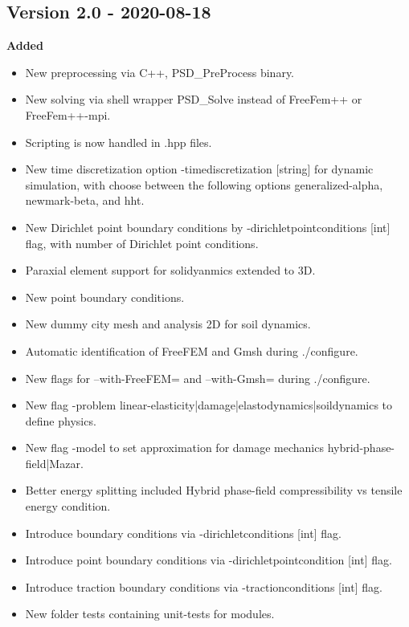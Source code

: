 \subsection{Version 2.0 - 2020-08-18}
\textbf{Added}
\begin{itemize}
    \item New preprocessing via C++, {\ttfamily PSD\_PreProcess} binary.
    \item New solving via shell wrapper {\ttfamily PSD\_Solve} instead of {\ttfamily FreeFem++} or {\ttfamily FreeFem++-mpi}.    
    \item Scripting is now handled in {\ttfamily .hpp} files.
    \item New time discretization option {\ttfamily -timediscretization [string]} for dynamic simulation, with {\ttfamily [string]} choose between the following options {\ttfamily generalized-alpha}, {\ttfamily newmark-beta}, and {\ttfamily hht}.
    \item New Dirichlet point boundary conditions  by {\ttfamily -dirichletpointconditions [int]} flag, with {\ttfamily  [int]} number of Dirichlet point conditions.
    \item Paraxial element support for solidyanmics extended to 3D.
    \item New point boundary conditions.
    \item New dummy city mesh and analysis 2D for soil dynamics. 
    \item Automatic identification of FreeFEM and Gmsh during {\ttfamily./configure}.
     \item New flags for {\ttfamily --with-FreeFEM=} and {\ttfamily--with-Gmsh=} during {\ttfamily./configure}.
     \item New flag {\ttfamily -problem linear-elasticity|damage|elastodynamics|soildynamics} to define physics.
     \item New flag {\ttfamily -model} to set approximation for damage mechanics {\ttfamily hybrid-phase-field|Mazar}.
    \item Better energy splitting included Hybrid phase-field compressibility vs tensile energy condition.
    \item Introduce boundary conditions via {\ttfamily -dirichletconditions [int]} flag. 
    \item Introduce point boundary conditions via {\ttfamily -dirichletpointcondition [int]} flag. 
    \item Introduce traction boundary conditions via  {\ttfamily -tractionconditions [int]} flag.
    \item New folder {\ttfamily tests} containing unit-tests for modules.

\end{itemize}

